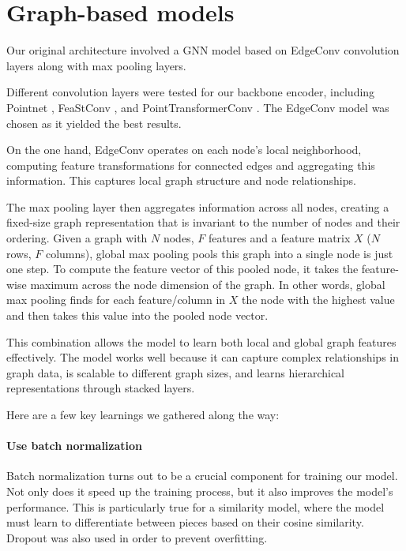 \section{Graph-based models}

Our original architecture involved a GNN model based on EdgeConv \cite{wangDynamicGraphCNN2019} convolution layers along with max pooling layers. 

Different convolution layers were tested for our backbone encoder, including Pointnet \cite{qiPointNetDeepHierarchical2017}, FeaStConv \cite{vermaFeaStNetFeatureSteeredGraph2018}, and PointTransformerConv \cite{zhaoPointTransformer2021}. The EdgeConv model was chosen as it yielded the best results.


On the one hand, EdgeConv operates on each node's local neighborhood, computing feature transformations for connected edges and aggregating this information. This captures local graph structure and node relationships. 

The max pooling layer then aggregates information across all nodes, creating a fixed-size graph representation that is invariant to the number of nodes and their ordering.
Given a graph with $N$ nodes, $F$ features and a feature matrix $X$ ($N$ rows, $F$ columns), global max pooling pools this graph into a single node is just one step. To compute the feature vector of this pooled node, it takes the feature-wise maximum across the node dimension of the graph. In other words, global max pooling finds for each feature/column in $X$ the node with the highest value and then takes this value into the pooled node vector. 

This combination allows the model to learn both local and global graph features effectively. The model works well because it can capture complex relationships in graph data, is scalable to different graph sizes, and learns hierarchical representations through stacked layers.

Here are a few key learnings we gathered along the way:

\paragraph{Use batch normalization}

Batch normalization \cite{ioffeBatchNormalizationAccelerating2015} turns out to be a crucial component for training our model. Not only does it speed up the training process, but it also improves the model's performance. This is particularly true for a similarity model, where the model must learn to differentiate between pieces based on their cosine similarity. Dropout was also used in order to prevent overfitting.

